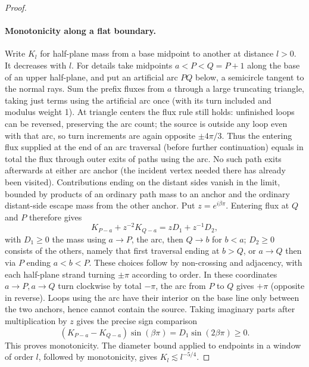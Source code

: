 \begin{proof}
\paragraph{Monotonicity along a flat boundary.}
Write \(K_l\) for half-plane mass from a base midpoint to another at distance \(l>0\). It decreases with \(l\). For details take midpoints \(a<P<Q=P+1\) along the base of an upper half-plane, and put an artificial arc \(P Q\) below, a semicircle tangent to the normal rays. Sum the prefix fluxes from \(a\) through a large truncating triangle, taking just terms using the artificial arc once (with its turn included and modulus weight 1). At triangle centers the flux rule still holds: unfinished loops can be reversed, preserving the arc count; the source is outside any loop even with that arc, so turn increments are again opposite \(\pm4\pi/3\). Thus the entering flux supplied at the end of an arc traversal (before further continuation) equals in total the flux through outer exits of paths using the arc. No such path exits afterwards at either arc anchor (the incident vertex needed there has already been visited). Contributions ending on the distant sides vanish in the limit, bounded by products of an ordinary path mass to an anchor and the ordinary distant-side escape mass from the other anchor. Put \(z=e^{i\beta\pi}\). Entering flux at \(Q\) and \(P\) therefore gives
\[
 K_{P-a}+z^{-2}K_{Q-a}=z D_1+z^{-1}D_2,
\]
with \(D_1\ge0\) the mass using \(a\to P\), the arc, then \(Q\to b\) for \(b<a\); \(D_2\ge0\) consists of the others, namely that first traversal ending at \(b>Q\), or \(a\to Q\) then via \(P\) ending \(a<b<P\). These choices follow by non-crossing and adjacency, with each half-plane strand turning \(\pm\pi\) according to order. In these coordinates \(a\to P,a\to Q\) turn clockwise by total \(-\pi\), the arc from \(P\) to \(Q\) gives \(+\pi\) (opposite in reverse). Loops using the arc have their interior on the base line only between the two anchors, hence cannot contain the source. Taking imaginary parts after multiplication by \(z\) gives the precise sign comparison
\[
 (K_{P-a}-K_{Q-a})\sin(\beta\pi)
   =D_1\sin(2\beta\pi)\ge0.
\]
This proves monotonicity. The diameter bound applied to endpoints in a window of order \(l\), followed by monotonicity, gives \(K_l\lesssim l^{-5/4}\).


\end{proof}
